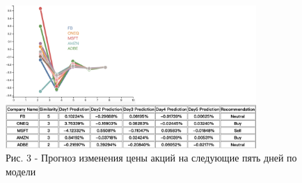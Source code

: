 \begin{figure}[H]
	\centering
	\includegraphics[width=0.85\textwidth]{media/ict2/image5}
	\caption*{Рис. 3 - Прогноз изменения цены акций на следующие пять дней по модели}
\end{figure}


